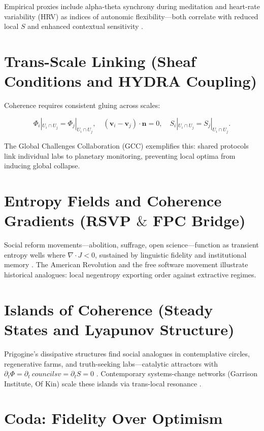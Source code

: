 \documentclass[12pt,a4paper]{article}
\begin{document}
Empirical proxies include alpha-theta synchrony during meditation and heart-rate variability (HRV) as indices of autonomic flexibility—both correlate with reduced local $S$ and enhanced contextual sensitivity \cite{varela1991embodied}.

\section{Trans-Scale Linking \quad (Sheaf Conditions and HYDRA Coupling)}

Coherence requires consistent gluing across scales:

\begin{equation}
\Phi_i|_{U_i\cap U_j} = \Phi_j|_{U_i\cap U_j}, \quad (\bm{v}_i - \bm{v}_j)\!\cdot\!\bm{n} = 0, \quad S_i|_{U_i\cap U_j} = S_j|_{U_i\cap U_j}.
\end{equation}

The Global Challenges Collaboration (GCC) exemplifies this: shared protocols link individual labs to planetary monitoring, preventing local optima from inducing global collapse.

\section{Entropy Fields and Coherence Gradients \quad (RSVP $\&$ FPC Bridge)}

Social reform movements—abolition, suffrage, open science—function as transient entropy wells where $\nabla\!\cdot\!J < 0$, sustained by linguistic fidelity and institutional memory \cite{guimond2025rsvp}. The American Revolution and the free software movement illustrate historical analogues: local negentropy exporting order against extractive regimes.

\section{Islands of Coherence \quad (Steady States and Lyapunov Structure)}

Prigogine’s dissipative structures find social analogues in contemplative circles, regenerative farms, and truth-seeking labs—catalytic attractors with $\partial_t \Phi = \partial_t \ councils v = \partial_t S = 0$ \cite{prigogine1984order}. Contemporary systems-change networks (Garrison Institute, Of Kin) scale these islands via trans-local resonance \cite{mcdougall2022islands}.

\section*{Coda: Fidelity Over Optimism}
\end{document}
